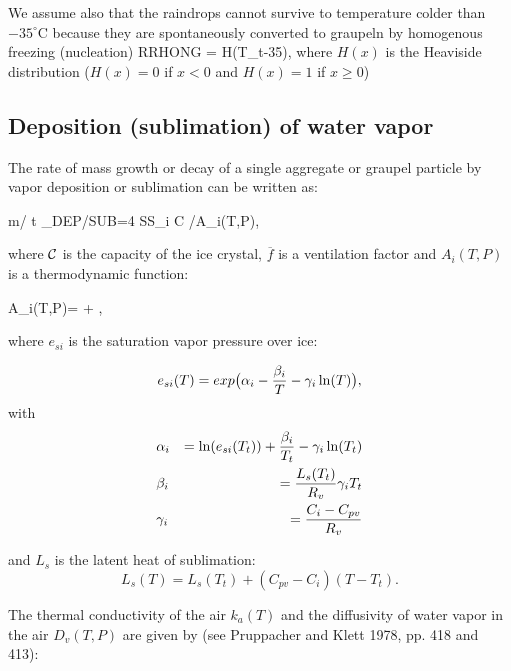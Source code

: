 We assume also that the raindrops cannot survive to temperature colder than
$-35^\circ$C because they are spontaneously converted to graupeln by homogenous
freezing (nucleation)
%
\be\label{HOM5}
RRHONG =  H(T_t-35),
\ee
\noindent where $H(x)$ is the Heaviside distribution ($H(x)=0$ if $x<0$ and
$H(x)=1$ if $x \ge 0$)


%
\subsection{Deposition (sublimation) of water vapor}
%

The rate of mass growth or decay of a single aggregate or graupel particle by
vapor deposition or sublimation can be written as:

%
\be\label{DEP1}
\partial m/ \partial t \mid_{DEP/SUB}=4 \pi SS_i {\cal C}  /A_{i}(T,P),
\ee
%

\noindent where $\cal C$ is the capacity of the ice crystal, $\overline{f}$ is a
ventilation factor and $A_{i}(T,P)$ is a thermodynamic function:

%
\be\label{DEP2}
A_{i}(T,P)=  +
        ,
\ee
%

\noindent where $e_{si}$ is the saturation vapor pressure over ice:

\begin{equation}
e_{si}(T)= exp \big( \alpha_i - {\beta_i \over T} - \gamma_i \ln (T) \big),
\end{equation}
with
\begin{eqnarray}
&\alpha_i   &= \ln (e_{si}(T_t))+{\beta_i \over T_t} - \gamma_i \ln (T_t) \\
&\beta_i   &= {L_s(T_t) \over R_v}\gamma_i T_t \\
&\gamma_i  &= {C_i -C_{pv} \over R_v}
\end{eqnarray}

\noindent and $L_s$ is the latent heat of sublimation:
\begin{equation}
L_s(T) = L_s(T_t) + (C_{pv} - C_i)(T-T_t).
\end{equation}

\noindent The thermal conductivity of the air $k_{a}(T)$ and the diffusivity of
water vapor in the air $D_{v}(T,P)$ are given by (see Pruppacher and Klett 1978, pp. 418 and 413):

